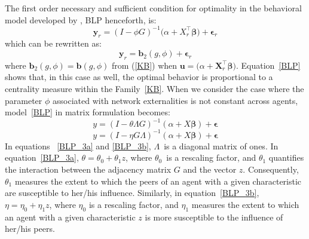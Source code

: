 \documentclass[nojss]{jss}
\begin{document}
	The first order necessary and sufficient condition for optimality in the behavioral model developed by \cite{Battaglini+Sciabolazza+Patacchini:2018}, BLP henceforth, is: 
	\begin{equation}
	\mathbf{y}_{r}=\left(I-\phi G\right) ^{-1}(\alpha
	+X_{r}^\top\mathbf{\beta )}+\mathbf{\epsilon }_{r}
	\label{BLP0}
	\end{equation}
	which can be rewritten as:
	\begin{equation}
	\mathbf{y}_{r}=\boldsymbol{b}_{2}\left( g,\phi \right)+\mathbf{\epsilon}_{r}  
	\label{BLP}
	\end{equation}
	where $\boldsymbol{b}_{2}\left( g,\phi \right) =\boldsymbol{b}\left( g,\phi
	\right) $ from (\ref{KB}) when $\boldsymbol{u}=(\alpha +\boldsymbol{X}_{r}^\top\mathbf{\beta)}$. Equation~\ref{BLP} shows that, in this case as well, the optimal behavior is proportional to a centrality measure within the Family~\ref{KB}.
	When we consider the case where the parameter $\phi$ associated with network externalities is not constant across agents, model~\ref{BLP} in matrix formulation becomes:
	\begin{equation}
	y=(I-\theta \Lambda G)^{-1}(\alpha +X\mathbf{\beta })+\mathbf{\epsilon}
	\label{BLP_3a}
	\end{equation}
	\begin{equation}
	y=(I-\eta G\Lambda)^{-1}(\alpha +X\mathbf{\beta })+\mathbf{\epsilon}
	\label{BLP_3b}
	\end{equation}
	In equations ~\ref{BLP_3a} and \ref{BLP_3b}, $\Lambda $\ is a diagonal matrix of ones. In equation~\ref{BLP_3a}, $\theta =\theta _{0}+\theta _{1}z$, where $\theta _{0}$\ is a rescaling factor, and $\theta _{1}$ quantifies the interaction between the adjacency matrix $G$ and the vector $z$. Consequently, $\theta _{1}$ measures the extent to which the peers of an agent with a given characteristic are susceptible to her/his influence. Similarly, in equation~\ref{BLP_3b}, $\eta =\eta _{0}+\eta _{1}z$, where $\eta _{0}$ is a rescaling factor, and $\eta _{1}$ measures the extent to which an agent with a given characteristic $z$ is more susceptible to the influence of her/his peers.
	
\end{document}
